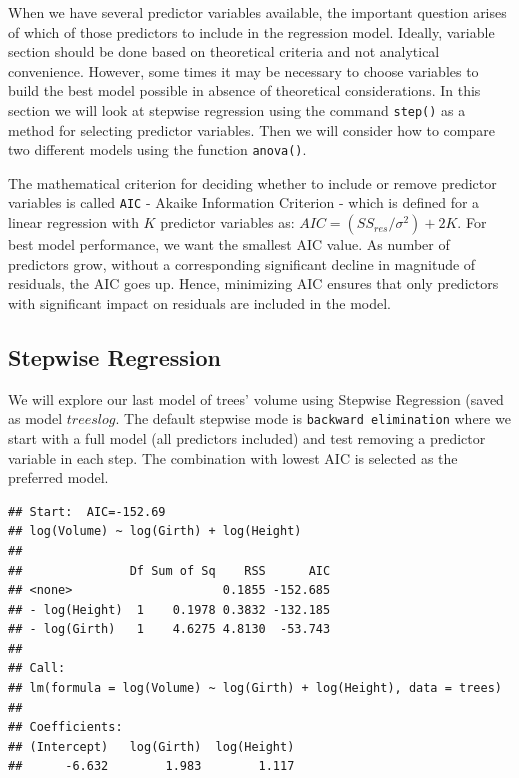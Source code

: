 \documentclass[11pt, letterpaper, twoside]{memoir}\usepackage{knitr}
\begin{document}
When we have several predictor variables available, the important question arises of which of those predictors to include in the regression model. Ideally, variable section should be done based on theoretical criteria and not analytical convenience. However, some times it may be necessary to choose variables to build the best model possible in absence of theoretical considerations. In this section we will look at stepwise regression using the command \texttt{step()} as a method for selecting predictor variables. Then we will consider how to compare two different models using the function \texttt{anova()}. 

The mathematical criterion for deciding whether to include or remove predictor variables is called \texttt{AIC} - Akaike Information Criterion - which is defined for a linear regression with $K$ predictor variables as: \( AIC = (SS_{res} / \sigma^2) + 2K \). For best model performance, we want the smallest AIC value. As number of predictors grow, without a corresponding significant decline in magnitude of residuals, the AIC goes up. Hence, minimizing AIC ensures that only predictors with significant impact on residuals are included in the model.

\subsection{Stepwise Regression}

We will explore our last model of trees' volume using Stepwise Regression (saved as model $treeslog$. The default stepwise mode is \texttt{backward elimination} where we start with a full model (all predictors included) and test removing a predictor variable in each step. The combination with lowest AIC is selected as the preferred model.  
\begin{knitrout}
\color{fgcolor}\begin{kframe}
\begin{alltt}
\hlstd{(}   \hlstd{=} \hlstd{)}
\end{alltt}
\begin{verbatim}
## Start:  AIC=-152.69
## log(Volume) ~ log(Girth) + log(Height)
## 
##               Df Sum of Sq    RSS      AIC
## <none>                     0.1855 -152.685
## - log(Height)  1    0.1978 0.3832 -132.185
## - log(Girth)   1    4.6275 4.8130  -53.743
## 
## Call:
## lm(formula = log(Volume) ~ log(Girth) + log(Height), data = trees)
## 
## Coefficients:
## (Intercept)   log(Girth)  log(Height)  
##      -6.632        1.983        1.117
\end{verbatim}
\end{kframe}
\end{knitrout}
\end{document}
